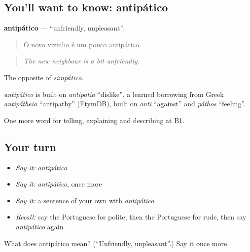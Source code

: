 \subsection*{You'll want to know: antipático}
\textbf{antipático} — \textquotedblleft{}unfriendly, unpleasant\textquotedblright{}.

\begin{quote}
O novo vizinho é um pouco antipático.
\end{quote}

\begin{quote}
\emph{The new neighbour is a bit unfriendly.}
\end{quote}

The opposite of \emph{simpático}.

\begin{cousinweb}
\emph{antipático} is built on \emph{antipatia} \textquotedblleft{}dislike\textquotedblright{}, a learned borrowing from Greek \emph{antipátheia} \textquotedblleft{}antipathy\textquotedblright{} (EtymDB), built on \emph{anti} \textquotedblleft{}against\textquotedblright{} and \emph{páthos} \textquotedblleft{}feeling\textquotedblright{}.
\end{cousinweb}

\begin{grammarlens}[title={What you've built}]
One more word for telling, explaining and describing at B1.
\end{grammarlens}

\subsection*{Your turn}
\begin{itemize}
\raggedright
  \item \emph{Say it:} \emph{antipático}
  \item \emph{Say it:} \emph{antipático}, once more
  \item \emph{Say it:} a sentence of your own with \emph{antipático}
  \item \emph{Recall:} say the Portuguese for polite, then the Portuguese for rude, then say \emph{antipático} again
\end{itemize}

\begin{tcolorbox}[breakable,colback=teal!4,colframe=teal!35!black,title={Before you move on}]
What does antipático mean? (\textquotedblleft{}Unfriendly, unpleasant\textquotedblright{}.) Say it once more.
\end{tcolorbox}
